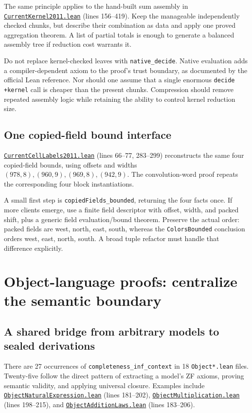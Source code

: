 \documentclass[11pt,letterpaper]{article}
\newcommand{\code}[1]{\nolinkurl{#1}}
\newcommand{\src}[2]{\href{https://github.com/VladimirReshetnikov/ProveIt/blob/60e9c5d620c6c387d932876cfa2d9376f64ea56c/Computability/DiophantineConsistency/Lean/DiophantineConsistency/#1.lean}{\nolinkurl{#1.lean}} (lines #2)}
\begin{document}
The same principle applies to the hand-built sum assembly in
\src{CurrentKernel2011}{156--419}. Keep the manageable independently
checked chunks, but describe their combination as data and apply one
proved aggregation theorem. A list of partial totals is enough to
generate a balanced assembly tree if reduction cost warrants it.

Do not replace kernel-checked leaves with \code{native_decide}. Native
evaluation adds a compiler-dependent axiom to the proof's trust boundary,
as documented by the official Lean reference. Nor should one assume that
a single enormous \code{decide +kernel} call is cheaper than the present
chunks. Compression should remove repeated assembly logic while retaining
the ability to control kernel reduction size.

\subsection{One copied-field bound interface}

\src{CurrentCellLabels2011}{66--77, 283--299} reconstructs the same
four copied-field bounds, using offsets and widths
\((978,8),(960,9),(969,8),(942,9)\). The convolution-word proof repeats
the corresponding four block instantiations.

A small first step is \code{copiedFields_bounded}, returning the four
facts once. If more clients emerge, use a finite field descriptor with
offset, width, and packed shift, plus a generic field evaluation/bound
theorem. Preserve the actual order: packed fields are west, north, east,
south, whereas the \code{ColorsBounded} conclusion orders west, east,
north, south. A broad tuple refactor must handle that difference explicitly.

\section{Object-language proofs: centralize the semantic boundary}

\subsection{A shared bridge from arbitrary models to sealed derivations}

There are 27 occurrences of \code{completeness_inf_context} in 18
\code{Object*.lean} files. Twenty-five follow the direct pattern of
extracting a model's ZF axioms, proving semantic validity, and applying
universal closure. Examples include
\src{ObjectNaturalExpression}{181--202},
\src{ObjectMultiplication}{198--215}, and
\src{ObjectAdditionLaws}{183--206}.
\end{document}
